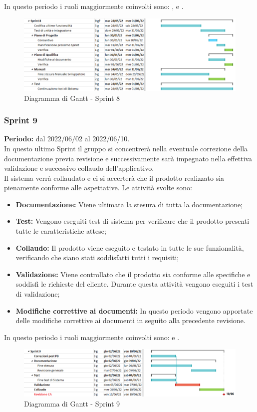 In questo periodo i ruoli maggiormente coinvolti sono: \roleDesignerLow{}, \roleProgrammerLow{} e \roleVerifierLow{}.
\begin{figure}[H]
  \centering
  \includegraphics[scale=0.55]{immagini/8Sprint.png}
  \caption{Diagramma di Gantt - Sprint 8}
\end{figure}
\pagebreak

\subsubsection{Sprint 9} \label{subsubsection:sprint_9}
\textbf{Periodo:} dal 2022/06/02 al 2022/06/10.
\bigskip
\\In questo ultimo Sprint\glo{} il gruppo si concentrerà nella eventuale correzione della documentazione previa revisione e successivamente sarà impegnato nella effettiva validazione e successivo collaudo dell'applicativo.
\\Il sistema verrà collaudato e ci si accerterà che il prodotto realizzato sia pienamente conforme alle aspettative.
Le attività svolte sono:
\begin{itemize}
  \item \textbf{Documentazione:} Viene ultimata la stesura di tutta la documentazione;
  \item \textbf{Test:} Vengono eseguiti test di sistema per verificare che il prodotto presenti tutte le caratteristiche attese;
  \item \textbf{Collaudo:} Il prodotto viene eseguito e testato in tutte le sue funzionalità, verificando che siano stati soddisfatti tutti i requisiti;
  \item \textbf{Validazione:} Viene controllato che il prodotto sia conforme alle specifiche e soddisfi le richieste del cliente.
        Durante questa attività vengono eseguiti i test di validazione;
  \item \textbf{Modifiche correttive ai documenti:} In questo periodo vengono apportate delle modifiche correttive ai documenti in seguito alla precedente revisione.
\end{itemize}
In questo periodo i ruoli maggiormente coinvolti sono: \roleProgrammerLow{} e \roleVerifierLow{}.
\bigskip
\begin{figure}[H]
  \centering
  \includegraphics[scale=0.55]{immagini/9sprint.png}
  \caption{Diagramma di Gantt - Sprint 9}
\end{figure}
\pagebreak